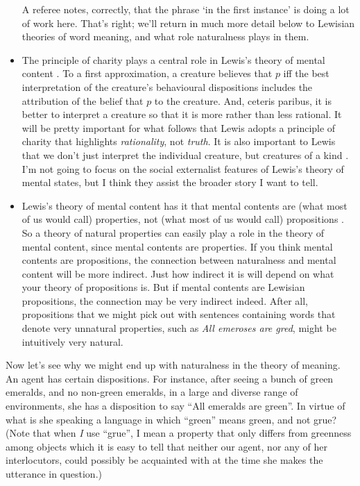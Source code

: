 \begin{itemize}
{A referee notes, correctly, that the phrase `in the first instance' is doing a lot of work here. That's right; we'll return in much more detail below to Lewisian theories of word meaning, and what role naturalness plays in them.}
\item The principle of charity plays a central role in Lewis's theory of mental content \citet{Lewis1974c, Lewis1994b}. To a first approximation, a creature believes that $p$ iff the best interpretation of the creature's behavioural dispositions includes the attribution of the belief that $p$ to the creature. And, ceteris paribus, it is better to interpret a creature so that it is more rather than less rational. It will be pretty important for what follows that Lewis adopts a principle of charity that highlights \textit{rationality}, not \textit{truth}. It is also important to Lewis that we don't just interpret the individual creature, but creatures of a kind \citep{Lewis1980c}. I'm not going to focus on the social externalist features of Lewis's theory of mental states, but I think they assist the broader story I want to tell.
\item Lewis's theory of mental content has it that mental contents are (what most of us would call) properties, not (what most of us would call) propositions \citep{Lewis1979b}. So a theory of natural properties can easily play a role in the theory of mental content, since mental contents are properties. If you think mental contents are propositions, the connection between naturalness and mental content will be more indirect. Just how indirect it is will depend on what your theory of propositions is. But if mental contents are Lewisian propositions, the connection may be very indirect indeed. After all, propositions that we might pick out with sentences containing words that denote very unnatural properties, such as \textit{All emeroses are gred}, might be intuitively very natural.
\end{itemize}

\noindent Now let's see why we might end up with naturalness in the theory of meaning. An agent has certain dispositions. For instance, after seeing a bunch of green emeralds, and no non-green emeralds, in a large and diverse range of environments, she has a disposition to say ``All emeralds are green''. In virtue of what is she speaking a language in which ``green'' means green, and not grue? (Note that when \textit{I} use ``grue'', I mean a property that only differs from greenness among objects which it is easy to tell that neither our agent, nor any of her interlocutors, could possibly be acquainted with at the time she makes the utterance in question.)

